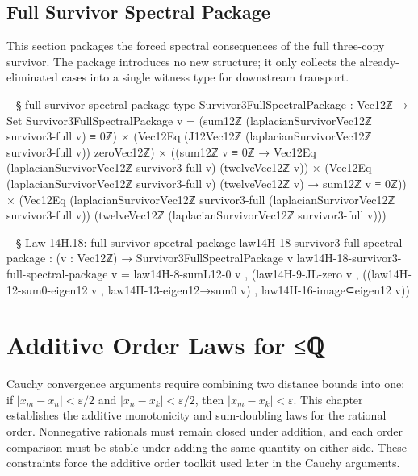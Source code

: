 \documentclass[11pt,a4paper]{book}
\def\leq{<=}%
\def\mathbb#1{#1}%
\def\texorpdfstring#1#2{#2}%
\begin{document}
\section{Full Survivor Spectral Package}

This section packages the forced spectral consequences of the full three-copy survivor.
The package introduces no new structure; it only collects the already-eliminated
cases into a single witness type for downstream transport.

\begin{code}
  -- § full-survivor spectral package type
  Survivor3FullSpectralPackage : Vec12ℤ → Set
  Survivor3FullSpectralPackage v =
    (sum12ℤ (laplacianSurvivorVec12ℤ survivor3-full v) ≡ 0ℤ) ×
    (Vec12Eq (J12Vec12ℤ (laplacianSurvivorVec12ℤ survivor3-full v)) zeroVec12ℤ) ×
    ((sum12ℤ v ≡ 0ℤ → Vec12Eq (laplacianSurvivorVec12ℤ survivor3-full v) (twelveVec12ℤ v)) ×
     (Vec12Eq (laplacianSurvivorVec12ℤ survivor3-full v) (twelveVec12ℤ v) → sum12ℤ v ≡ 0ℤ)) ×
    (Vec12Eq (laplacianSurvivorVec12ℤ survivor3-full (laplacianSurvivorVec12ℤ survivor3-full v))
             (twelveVec12ℤ (laplacianSurvivorVec12ℤ survivor3-full v)))

  -- § Law 14H.18: full survivor spectral package
  law14H-18-survivor3-full-spectral-package : (v : Vec12ℤ) → Survivor3FullSpectralPackage v
  law14H-18-survivor3-full-spectral-package v =
    law14H-8-sumL12-0 v ,
    (law14H-9-JL-zero v ,
     ((law14H-12-sum0-eigen12 v , law14H-13-eigen12→sum0 v) ,
      law14H-16-image⊆eigen12 v))
\end{code}


\chapter{Additive Order Laws for \texorpdfstring{$\leq_{\mathbb{Q}}$}{≤ℚ}}
\label{ch:additive-order-laws}

Cauchy convergence arguments require combining two distance bounds into one:
if $|x_m - x_n| < \varepsilon/2$ and $|x_n - x_k| < \varepsilon/2$,
then $|x_m - x_k| < \varepsilon$.  This chapter establishes the additive
monotonicity and sum-doubling laws for the rational order.  Nonnegative
rationals must remain closed under addition, and each order comparison must be
stable under adding the same quantity on either side.  These constraints force
the additive order toolkit used later in the Cauchy arguments.
\end{document}
